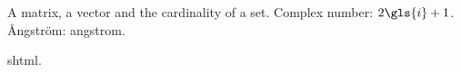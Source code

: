 \documentclass{report}
\begin{document}
A \gls{matrix}, a \gls{vector} and the \gls{cardinality}
of a \gls{set}. Complex number: $2\gls{i}+1$.
\AA ngstr\"om: \gls{angstrom}.

\gls{shtml}.

\printunsrtglossaries
\end{document}
